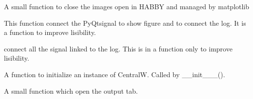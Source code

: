 \documentclass[letterpaper,10pt,english]{sphinxmanual}
\begin{document}
\begin{fulllineitems}
\begin{fulllineitems}
\label{\detokenize{index:src_GUI.Main_windows_1.CentralW.closefig}}
A small function to close the images open in HABBY and managed by matplotlib

\end{fulllineitems}


\begin{fulllineitems}
\label{\detokenize{index:src_GUI.Main_windows_1.CentralW.connect_signal_fig_and_drop}}
This function connect the PyQtsignal to show figure and to connect the log. It is a function to
improve lisibility.

\end{fulllineitems}


\begin{fulllineitems}
\label{\detokenize{index:src_GUI.Main_windows_1.CentralW.connect_signal_log}}
connect all the signal linked to the log. This is in a function only to improve lisibility.

\end{fulllineitems}


\begin{fulllineitems}
\label{\detokenize{index:src_GUI.Main_windows_1.CentralW.init_iu}}
A function to initialize an instance of CentralW. Called by \_\_init\_\_\_().

\end{fulllineitems}


\begin{fulllineitems}
\label{\detokenize{index:src_GUI.Main_windows_1.CentralW.optfig}}
A small function which open the output tab.

\end{fulllineitems}


\end{fulllineitems}
\end{document}
